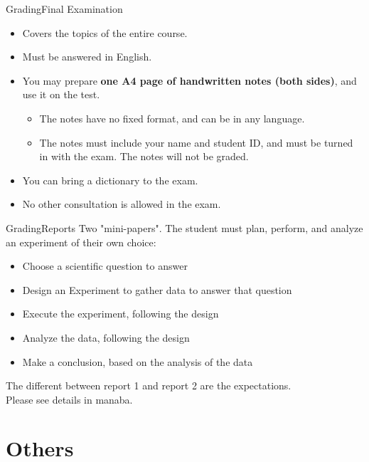 \documentclass[aspectratio=169]{beamer}
\begin{document}
\begin{CJK}{UTF8}{ipxm}
\begin{frame}{Grading}{Final Examination}
  \begin{itemize}
    \item Covers the topics of the entire course.
    \item Must be answered in English.
    \item You may prepare {\bf one A4 page of handwritten notes (both sides)}, and use it on the test.
    \begin{itemize}
      \item The notes have no fixed format, and can be in any language.
      \item The notes must include your name and student ID, and must be turned in with the exam. The notes will not be graded.
    \end{itemize}
    \item You can bring a dictionary to the exam.
    \item No other consultation is allowed in the exam.
  \end{itemize}
\end{frame}

\begin{frame}{Grading}{Reports}
  Two "mini-papers". The student must plan, perform, and analyze an experiment of their own choice:\bigskip

  \begin{itemize}
    \item Choose a scientific question to answer
    \item Design an Experiment to gather data to answer that question
    \item Execute the experiment, following the design
    \item Analyze the data, following the design
    \item Make a conclusion, based on the analysis of the data
  \end{itemize}\bigskip

  The different between report 1 and report 2 are the expectations.\\ Please see details in manaba.
\end{frame}

\section{Others}


\end{CJK}
\end{document}
